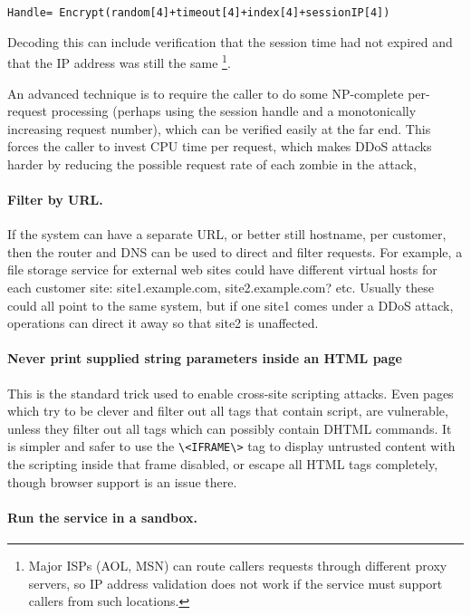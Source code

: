 \documentclass[draft]{report}
\begin{document}
\verb$Handle= Encrypt(random[4]+timeout[4]+index[4]+sessionIP[4])$

Decoding this can include verification that the session time had not
expired and that the IP address was still the same \footnote{Major ISPs
(AOL, MSN) can route callers requests through different proxy servers,
so IP address validation does not work if the service must support
callers from such locations.}.

An advanced technique is to require the caller to do some NP-complete
per-request processing (perhaps using the session handle and a
monotonically increasing request number), which can be verified easily
at the far end. This forces the caller to invest CPU time per request,
which makes DDoS attacks harder by reducing the possible request rate of
each zombie in the attack,

\paragraph{Filter by URL.}

If the system can have a separate URL, or better still hostname, per
customer, then the router and DNS can be used to direct and filter
requests. For example, a file storage service for external web sites
could have different virtual hosts for each customer site:
site1.example.com, site2.example.com? etc. Usually these could all point
to the same system, but if one site1 comes under a DDoS attack,
operations can direct it away so that site2 is unaffected.

\paragraph{Never print supplied string parameters inside an HTML page}

This is the standard trick used to enable cross-site scripting attacks.
Even pages which try to be clever and filter out all tags that contain
script, are vulnerable, unless they filter out all tags which can
possibly contain DHTML commands. It is simpler and safer to use the
\verb$\<IFRAME\>$ tag to display untrusted content with the scripting
inside that frame disabled, or escape all HTML tags completely, though
browser support is an issue there.

\paragraph{Run the service in a sandbox.}
\end{document}
